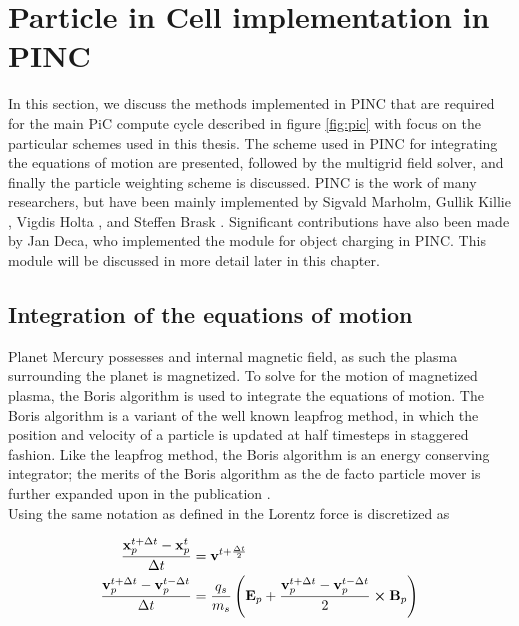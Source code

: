 \section{Particle in Cell implementation in PINC}
In this section, we discuss the methods implemented in PINC that are required for the main PiC compute cycle described in figure \ref{fig:pic} with focus on the particular schemes used in this thesis. The scheme used in PINC for integrating the equations of motion are presented, followed by the multigrid field solver, and finally the particle weighting scheme is discussed. PINC is the work of many researchers, but have been mainly implemented by Sigvald Marholm, Gullik Killie \parencite{Killie}, Vigdis Holta \parencite{Holta2018}, and Steffen Brask \parencite{Brask2018}. Significant contributions have also been made by Jan Deca, who implemented the module for object charging in PINC. This module will be discussed in more detail later in this chapter. 

\subsection{Integration of the equations of motion}
Planet Mercury possesses and internal magnetic field, as such the plasma surrounding the planet is magnetized. To solve for the motion of magnetized plasma, the Boris algorithm is used to integrate the equations of motion. The Boris algorithm is a variant of the well known leapfrog method, in which the position and velocity of a particle is updated at half timesteps in staggered fashion. Like the leapfrog method, the Boris algorithm is an energy conserving integrator; the merits of the Boris algorithm as the de facto particle mover is further expanded upon in the publication \parencite{Qin2013}.
\\
Using the same notation as defined in \parencite{Birdsall2004} the Lorentz force is discretized as 

\begin{subequations}
    \begin{align}
        \frac{\vb{x}^{t+\Delta t}_p - \vb{x}^t_p}{\Delta t} &= \vb{v}^{t + \frac{\Delta t}{2}} \\
        \frac{\vb{v}^{t+\Delta t}_p - \vb{v}^{t-\Delta t}_p}{\Delta t} &= \frac{q_s}{m_s} \left(\vb{E}_p + \frac{\vb{v}^{t+\Delta t}_p - \vb{v}^{t-\Delta t}_p}{2} \cross \vb{B}_p \right) \label{eq:borizVel}
    \end{align}
\end{subequations}

